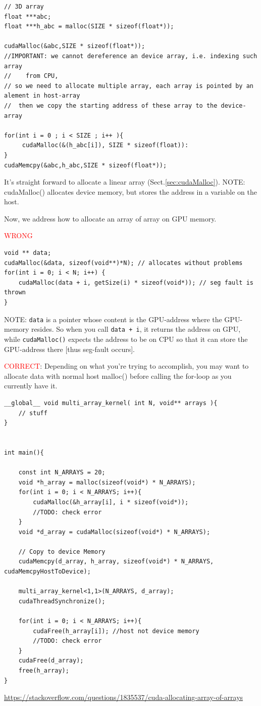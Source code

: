 \begin{lstlisting}
// 3D array
float ***abc;
float ***h_abc = malloc(SIZE * sizeof(float*));

cudaMalloc(&abc,SIZE * sizeof(float*));
//IMPORTANT: we cannot dereference an device array, i.e. indexing such array
//    from CPU, 
// so we need to allocate multiple array, each array is pointed by an alement in host-array
//  then we copy the starting address of these array to the device-array

for(int i = 0 ; i < SIZE ; i++ ){
     cudaMalloc(&(h_abc[i]), SIZE * sizeof(float)):
}
cudaMemcpy(&abc,h_abc,SIZE * sizeof(float*));
\end{lstlisting}


It's straight forward to allocate a linear array (Sect.\ref{sec:cudaMalloc}).
NOTE: cudaMalloc() allocates device memory, but stores the address in a variable
on the host.


Now, we address how to allocate an array of array on GPU memory.

\textcolor{red}{WRONG}
\begin{lstlisting}
void ** data;
cudaMalloc(&data, sizeof(void**)*N); // allocates without problems
for(int i = 0; i < N; i++) {
    cudaMalloc(data + i, getSize(i) * sizeof(void*)); // seg fault is thrown
}
\end{lstlisting}

NOTE: \verb!data! is a pointer whose content is the GPU-address where the
GPU-memory resides. So when you call \verb!data + i!, it returns the address on
GPU, while \verb!cudaMalloc()! expects the address to be on CPU so that it can
store the GPU-address there [thus seg-fault occurs].


\textcolor{red}{CORRECT}: Depending on what you're trying to accomplish, you may
want to allocate data with normal host malloc() before calling the for-loop as
you currently have it.

\begin{lstlisting}
__global__ void multi_array_kernel( int N, void** arrays ){
    // stuff
}


int main(){

    const int N_ARRAYS = 20;
    void *h_array = malloc(sizeof(void*) * N_ARRAYS);
    for(int i = 0; i < N_ARRAYS; i++){
        cudaMalloc(&h_array[i], i * sizeof(void*));
        //TODO: check error
    }
    void *d_array = cudaMalloc(sizeof(void*) * N_ARRAYS);

    // Copy to device Memory
    cudaMemcpy(d_array, h_array, sizeof(void*) * N_ARRAYS, cudaMemcpyHostToDevice);

    multi_array_kernel<1,1>(N_ARRAYS, d_array);
    cudaThreadSynchronize();

    for(int i = 0; i < N_ARRAYS; i++){
        cudaFree(h_array[i]); //host not device memory
        //TODO: check error
    }
    cudaFree(d_array);
    free(h_array);
}
\end{lstlisting}
\url{https://stackoverflow.com/questions/1835537/cuda-allocating-array-of-arrays}

